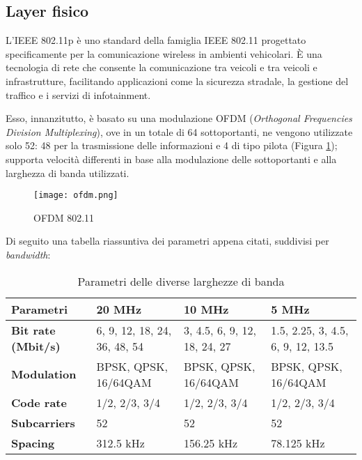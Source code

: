 \subsection[Layer fisico]{Layer fisico}
L'IEEE 802.11p è uno standard della famiglia IEEE 802.11 progettato specificamente per la comunicazione wireless in ambienti vehicolari. È una tecnologia di rete che consente la comunicazione tra veicoli e tra veicoli e infrastrutture, facilitando applicazioni come la sicurezza stradale, la gestione del traffico e i servizi di infotainment.

Esso, innanzitutto, è basato su una modulazione OFDM (\textit{Orthogonal Frequencies Division Multiplexing}), ove in un totale di 64 sottoportanti, ne vengono utilizzate solo 52: 48 per la trasmissione delle informazioni e 4 di tipo pilota (Figura \ref{fig:ofdm}); supporta velocità differenti in base alla modulazione delle sottoportanti e alla larghezza di banda utilizzati.

\begin{figure}[h!]
    \centering
    \texttt{[image: ofdm.png]}
    \caption{OFDM 802.11}
    \label{fig:ofdm}
\end{figure}

Di seguito una tabella riassuntiva dei parametri appena citati, suddivisi per \textit{bandwidth}:


\begin{table}[htbp]
    \centering
    \begin{tabular}{|p{7em}|p{7em}|p{7em}|p{7em}|} 
     \hline
     \textbf{Parametri} & \textbf{20 MHz} & \textbf{10 MHz} & \textbf{5 MHz} \\ 
     \hline
     \textbf{Bit rate (Mbit/s)} & 6, 9, 12, 18, 24, 36, 48, 54 & 3, 4.5, 6, 9, 12, 18, 24, 27 & 1.5, 2.25, 3, 4.5, 6, 9, 12, 13.5 \\ 
     \hline
     \textbf{Modulation} & BPSK, QPSK, 16/64QAM & BPSK, QPSK, 16/64QAM & BPSK, QPSK, 16/64QAM \\
     \hline
     \textbf{Code rate} & 1/2, 2/3, 3/4 & 1/2, 2/3, 3/4 & 1/2, 2/3, 3/4 \\
     \hline
     \textbf{Subcarriers} & 52 & 52 & 52 \\
     \hline
     \textbf{Spacing} & 312.5 kHz & 156.25 kHz & 78.125 kHz \\ 
     \hline
    \end{tabular}
    \caption{Parametri delle diverse larghezze di banda}
    \label{table:1}
\end{table}

